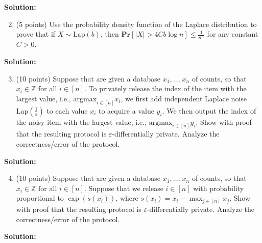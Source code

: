 \documentclass[11pt]{article}
\newcommand{\PPr}[1]{\ensuremath{\mathbf{Pr}\left[#1\right]}}
\newcommand{\eps}{\varepsilon}
\begin{document}
\noindent\textbf{Solution:}

\begin{enumerate}
\setcounter{enumi}{1}
\item (5 points)
Use the probability density function of the Laplace distribution to prove that if $X\sim\text{Lap}(b)$, then $\PPr{|X|>4Cb\log n}\le\frac{1}{n^C}$ for any constant $C>0$.  
\end{enumerate}

\noindent\textbf{Solution:}

\begin{enumerate}
\setcounter{enumi}{2}
\item (10 points)
Suppose that are given a database $x_1,\ldots,x_n$ of counts, so that $x_i\in\mathbb{Z}$ for all $i\in[n]$. 
To privately release the index of the item with the largest value, i.e., $\text{argmax}_{i\in[n]} x_i$, we first add independent Laplace noise $\text{Lap}\left(\frac{1}{\eps}\right)$ to each value $x_i$ to acquire a value $y_i$. 
We then output the index of the noisy item with the largest value, i.e., $\text{argmax}_{i\in[n]} y_i$. 
Show with proof that the resulting protocol is $\eps$-differentially private. 
Analyze the correctness/error of the protocol. 
\end{enumerate}

\noindent\textbf{Solution:}

\begin{enumerate}
\setcounter{enumi}{3}
\item (10 points)
Suppose that are given a database $x_1,\ldots,x_n$ of counts, so that $x_i\in\mathbb{Z}$ for all $i\in[n]$. 
Suppose that we release $i\in[n]$ with probability proportional to $\exp(s(x_i))$, where $s(x_i)=x_i-\max_{j\in[n]} x_j$. 
Show with proof that the resulting protocol is $\eps$-differentially private. 
Analyze the correctness/error of the protocol. 
\end{enumerate}

\noindent\textbf{Solution:}
\end{document}

